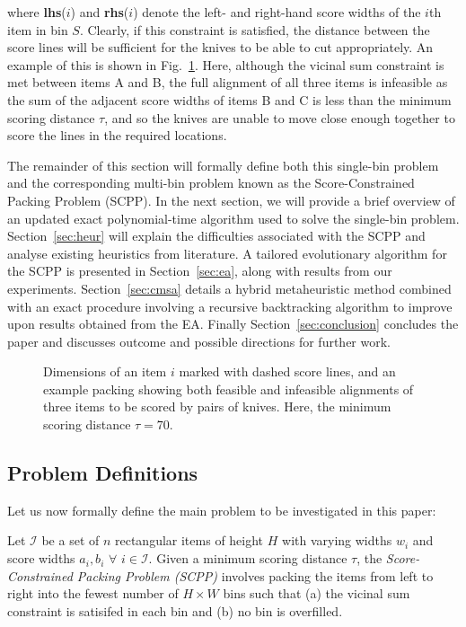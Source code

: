 \documentclass[a4paper,11pt,authoryear]{elsarticle}
\begin{document}
\noindent where \textbf{lhs}($i$) and \textbf{rhs}($i$) denote the left- and right-hand score widths of the $i$th item in bin $S$. Clearly, if this constraint is satisfied, the distance between the score lines will be sufficient for the knives to be able to cut appropriately. An example of this is shown in Fig.~\ref{fig:itemsdimknives}. Here, although the vicinal sum constraint is met between items A and B, the full alignment of all three items is infeasible as the sum of the adjacent score widths of items B and C is less than the minimum scoring distance $\tau$, and so the knives are unable to move close enough together to score the lines in the required locations.

The remainder of this section will formally define both this single-bin problem and the corresponding multi-bin problem known as the Score-Constrained Packing Problem (SCPP). In the next section, we will provide a brief overview of an updated exact polynomial-time algorithm used to solve the single-bin problem. Section~\ref{sec:heur} will explain the difficulties associated with the SCPP and analyse existing heuristics from literature. A tailored evolutionary algorithm for the SCPP is presented in Section~\ref{sec:ea}, along with results from our experiments. Section~\ref{sec:cmsa} details a hybrid metaheuristic method combined with an exact procedure involving a recursive backtracking algorithm to improve upon results obtained from the EA. Finally Section~\ref{sec:conclusion} concludes the paper and discusses outcome and possible directions for further work.

\begin{figure}[H]	
	\centering
	
	\caption{Dimensions of an item $i$ marked with dashed score lines, and an example packing showing both feasible and infeasible alignments of three items to be scored by pairs of knives. Here, the minimum scoring distance $\tau = 70$.}	
	\label{fig:itemsdimknives}
\end{figure}

\subsection{Problem Definitions}
\label{sub:intro}
\noindent Let us now formally define the main problem to be investigated in this paper:

\begin{definition}
	Let $\mathcal{I}$ be a set of $n$ rectangular items of height $H$ with varying widths $w_i$ and score widths $a_i, b_i$ $\forall$ $i \in \mathcal{I}$. Given a minimum scoring distance $\tau$, the \emph{Score-Constrained Packing Problem (SCPP)} involves packing the items from left to right into the fewest number of $H \times W$ bins such that (a) the vicinal sum constraint is satisifed in each bin and (b) no bin is overfilled.
	\label{defn:scpp}
\end{definition}	
\end{document}
